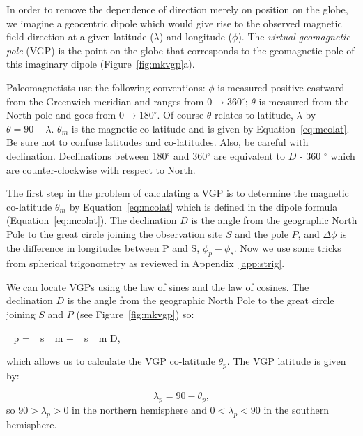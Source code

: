 In order to remove the dependence of direction merely on position 
on the globe,  we imagine a geocentric dipole which would
give rise to the observed magnetic field direction
 at a given latitude ($\lambda$) and
longitude ($\phi$).  
%
%
The {\it virtual geomagnetic pole} (VGP) is the point
on the globe that corresponds to the geomagnetic pole of this imaginary dipole 
(Figure~\ref{fig:mkvgp}a).

Paleomagnetists use the following conventions:   $\phi$  is measured
positive eastward from the Greenwich meridian and
ranges from $0 \rightarrow 360^\circ$;  $\theta $  is measured  from
the North pole and goes from $0 \rightarrow 180^\circ$. Of course
$\theta $ relates
to latitude, $\lambda $ by $\theta = 90 - \lambda $.  $\theta_m$ is the
magnetic co-latitude and is given by Equation~\ref{eq:mcolat}. 
Be sure not to confuse latitudes and co-latitudes.
Also, be careful with 
%
declination.  Declinations between 180$^\circ$
and 360$^{\circ}$ are equivalent to $D$ - 360 $^\circ$ which are
counter-clockwise with respect to North.  

The first step in the problem  of calculating a VGP is to determine the
%
 magnetic co-latitude $\theta_m$ by Equation~\ref{eq:mcolat} which is defined in the dipole formula (Equation~\ref{eq:mcolat}).
The declination $D$ is the angle from the geographic
North Pole to the
great circle joining the observation site $S$ and the pole $P$, and $\Delta \phi$ is the difference
in longitudes between P and S, 
$\phi_p-\phi_s$.  Now we use some tricks from 
%
spherical trigonometry as reviewed in Appendix~\ref{app:strig}.

 
We can  locate VGPs using the law of sines and the law of cosines. 
The 
declination $D$ is the angle from the geographic North Pole
to the
great circle joining $S$ and $P$ (see Figure~\ref{fig:mkvgp}) so:
 
\def\pih{{\pi \over 2}}
\beq \cos \theta_p = \cos \theta_s  \cos
\theta_m + \sin \theta_s \sin \theta_m \cos D, 
\label{eq:vgplat}
\eeq
 
\noindent which allows us to calculate the VGP co-latitude $\theta_p$. The
VGP latitude is given by:

$$
\lambda_p = 90 - \theta_p,
$$
\noindent so $90>\lambda_p>0$ in the northern hemisphere and
$0<\lambda_p<90$ in the southern hemisphere.
 
